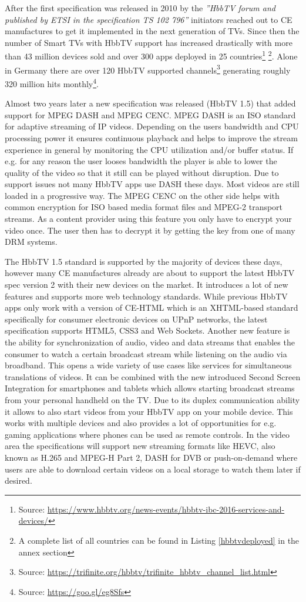 After the first specification was released in 2010 by the \textit{''HbbTV forum and published by ETSI in the specification TS 102 796''} \cite{evolution} initiators reached out to CE manufactures to get it implemented in the next generation of TVs. Since then the number of Smart TVs with HbbTV support has increased drastically with more than 43 million devices sold and over 300 apps deployed in 25 countries\footnote{Source: \url{https://www.hbbtv.org/news-events/hbbtv-ibc-2016-services-and-devices/}} \footnote{A complete list of all countries can be found in Listing \ref{hbbtvdeployed} in the annex section}. Alone in Germany there are over 120 HbbTV supported channels\footnote{Source: \url{https://trifinite.org/hbbtv/trifinite_hbbtv_channel_list.html}} generating roughly 320 million hits monthly\footnote{Source: \url{https://goo.gl/eg8Sfs}}.

Almost two years later a new specification was released (HbbTV 1.5) that added support for MPEG DASH and MPEG CENC. MPEG DASH is an ISO standard for adaptive streaming of IP videos. Depending on the users bandwidth and CPU processing power it ensures continuous playback and helps to improve the stream experience in general by monitoring the CPU utilization and/or buffer status. If e.g. for any reason the user looses bandwidth the player is able to lower the quality of the video so that it still can be played without disruption. Due to support issues not many HbbTV apps use DASH these days. Most videos are still loaded in a progressive way. The MPEG CENC on the other side helps with common encryption for ISO based media format files and MPEG-2 transport streams. As a content provider using this feature you only have to encrypt your video once. The user then has to decrypt it by getting the key from one of many DRM systems.

The HbbTV 1.5 standard is supported by the majority of devices these days, however many CE manufactures already are about to support the latest HbbTV spec version 2 with their new devices on the market. It introduces a lot of new features and supports more web technology standards. While previous HbbTV apps only work with a version of CE-HTML which is an XHTML-based standard specifically for consumer electronic devices on UPnP networks, the latest specification supports HTML5, CSS3 and Web Sockets. Another new feature is the ability for synchronization of audio, video and data streams that enables the consumer to watch a certain broadcast stream while listening on the audio via broadband. This opens a wide variety of use cases like services for simultaneous translations of videos. It can be combined with the new introduced Second Screen Integration for smartphones and tablets which allows starting broadcast streams from your personal handheld on the TV. Due to its duplex communication ability it allows to also start videos from your HbbTV app on your mobile device. This works with multiple devices and also provides a lot of opportunities for e.g. gaming applications where phones can be used as remote controls. In the video area the specifications will support new streaming formats like HEVC, also known as H.265 and MPEG-H Part 2, DASH for DVB or push-on-demand where users are able to download certain videos on a local storage to watch them later if desired.

